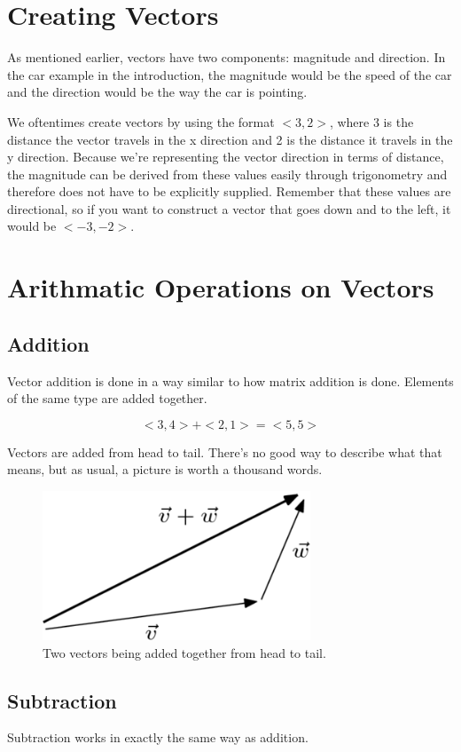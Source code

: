 \documentclass{article}
\begin{document}
\section{Creating Vectors}
As mentioned earlier, vectors have two components: magnitude and direction. In
the car example in the introduction, the magnitude would be the speed of the
car and the direction would be the way the car is pointing.

We oftentimes create vectors by using the format $<3, 2>$, where 3 is the
distance the vector travels in the x direction and 2 is the distance it travels
in the y direction. Because we're representing the vector direction in terms of
distance, the magnitude can be derived from these values easily through
trigonometry and therefore does not have to be explicitly supplied. Remember
that these values are directional, so if you want to construct a vector that
goes down and to the left, it would be $<-3, -2>$.

\section{Arithmatic Operations on Vectors}

\subsection{Addition}
Vector addition is done in a way similar to how matrix addition is done.
Elements of the same type are added together.

$$<3, 4> + <2, 1> = <5, 5>$$

Vectors are added from head to tail. There's no good way to describe what that
means, but as usual, a picture is worth a thousand words.

\begin{figure}[H]
	\centering
	\includegraphics[width=8cm]{vector-addition}
	\caption{Two vectors being added together from head to tail.}
	\label{fig:vector-addition}
\end{figure}

\subsection{Subtraction}
Subtraction works in exactly the same way as addition.
\end{document}
